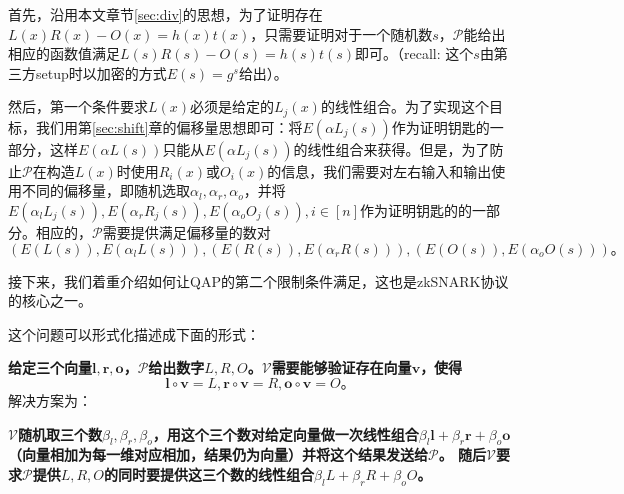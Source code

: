 \documentclass[12pt]{article}
\newcommand{\zk}{zkSNARK}
\newcommand{\pp}{$\mathcal{P}$}
\newcommand{\vv}{$\mathcal{V}$}
\begin{document}
首先，沿用本文章节\ref{sec:div}的思想，为了证明存在$L(x)R(x)-O(x)=h(x)t(x)$，只需要证明对于一个随机数$s$，\pp 能给出相应的函数值满足$L(s)R(s)-O(s)=h(s)t(s)$即可。（recall: 这个$s$由第三方setup时以加密的方式$E(s)=g^s$给出）。

然后，第一个条件要求$L(x)$必须是给定的$L_j(x)$的线性组合。为了实现这个目标，我们用第\ref{sec:shift}章的偏移量思想即可：将$ E(\alpha L_j(s))$作为证明钥匙的一部分，这样$E(\alpha L(s))$只能从$E(\alpha L_j(s))$的线性组合来获得。但是，为了防止\pp 在构造$L(x)$时使用$R_i(x)$或$O_i(x)$的信息，我们需要对左右输入和输出使用不同的偏移量，即随机选取$\alpha_l,\alpha_r,\alpha_o$，并将$E(\alpha_l L_j(s)),E(\alpha_r R_j(s)),E(\alpha_o O_j(s)),i \in [n]$作为证明钥匙的的一部分。相应的，\pp 需要提供满足偏移量的数对$$(E(L(s)),E(\alpha_l L(s))),(E(R(s)),E(\alpha_r R(s))),(E(O(s)),E(\alpha_o O(s)))\mbox{。}$$

接下来，我们着重介绍如何让QAP的第二个限制条件满足，这也是\zk 协议的核心之一。

这个问题可以形式化描述成下面的形式：

\textbf{给定三个向量$\bm{l},\bm{r},\bm{o}$，\pp 给出数字$L,R,O$。\vv 需要能够验证存在向量$\bm{v}$，使得
	$$\bm{l}\circ \bm{v} = L, \bm{r}\circ \bm{v} = R, \bm{o}\circ \bm{v} = O\mbox{。}$$}
解决方案为：

\textbf{\vv 随机取三个数$\beta_l,\beta_r,\beta_o$，用这个三个数对给定向量做一次线性组合$\beta_l\bm{l}+\beta_r\bm{r}+\beta_o\bm{o}$（向量相加为每一维对应相加，结果仍为向量）并将这个结果发送给\pp。 随后\vv 要求\pp 提供$L,R,O$的同时要提供这三个数的线性组合$\beta_l L+\beta_r R+\beta_o O$。}
\end{document}
